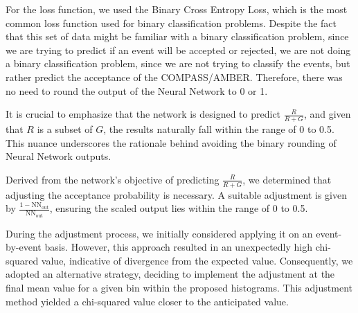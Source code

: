 \documentclass[EPJ,twocolumn]{webofc}
\begin{document}
For the loss function, we used the Binary Cross Entropy Loss, which is the most common loss function used for binary classification problems.
Despite the fact that this set of data might be familiar with a binary classification problem, since we are trying to predict if an event will be accepted or rejected,
we are not doing a binary classification problem, since we are not trying to classify the events, but rather predict the acceptance of the COMPASS/AMBER.
Therefore, there was no need to round the output of the Neural Network to 0 or 1. 

It is crucial to emphasize that the network is designed to predict $\frac{R}{R+G}$, and given that $R$ is a subset of $G$,
the results naturally fall within the range of 0 to 0.5. This nuance underscores the rationale behind avoiding the binary
rounding of Neural Network outputs.

Derived from the network's objective of predicting $\frac{R}{R+G}$, we determined that adjusting the acceptance probability
is necessary. A suitable adjustment is given by $\frac{1 - \text{NN}_{\text{out}}}{\text{NN}_{\text{out}}}$, ensuring the
scaled output lies within the range of 0 to 0.5.

During the adjustment process, we initially considered applying it on an event-by-event basis. However, this approach
resulted in an unexpectedly high chi-squared value, indicative of divergence from the expected value. Consequently,
we adopted an alternative strategy, deciding to implement the adjustment at the final mean value for a given bin within
the proposed histograms. This adjustment method yielded a chi-squared value closer to the anticipated value.




\end{document}
